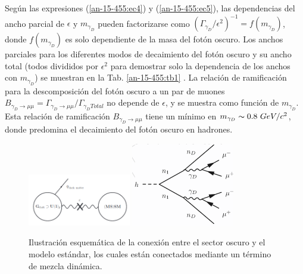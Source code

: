 Según las expresiones (\ref{an-15-455:ec4}) y (\ref{an-15-455:ec5}), las dependencias del ancho parcial de $\epsilon$ y $m_{\gamma_D}$ pueden factorizarse como $ (\Gamma_{\gamma_D}/\epsilon^2)^{-1}= f (m_{\gamma_D})$, donde $f (m_{\gamma_D})$ es solo dependiente de la masa del fotón oscuro. Los anchos parciales para los diferentes modos de decaimiento del fotón oscuro y su ancho total (todos divididos por $\epsilon^2$ para demostrar solo la dependencia de los anchos con $m_{\gamma_D}$) se muestran en la Tab. \ref{an-15-455:tb1} %
. La relación de ramificación para la descomposición del fotón oscuro a un par de muones $B_{\gamma_D\rightarrow \mu\mu} = \Gamma_{\gamma_D\rightarrow \mu\mu} /\Gamma_{\gamma_D Total}$ no depende de $\epsilon$, y se muestra %
como función de $m_{\gamma_D}$. Esta relación de ramificación $B_{\gamma_D\rightarrow\mu\mu}$ tiene un mínimo en $m_{\gamma_D}\thicksim 0.8 ~ GeV/ c^2$, donde predomina el decaimiento del fotón oscuro en hadrones. 

\begin{figure}
    \centering
    \includegraphics[width=0.4\textwidth]{Fisica_de_Particulas/imagenes/sketch_darksector.png}
    \includegraphics[width=0.4\textwidth]{Fisica_de_Particulas/imagenes/darksusy_feynman.png}
    \caption{ Ilustración esquemática de la conexión entre el sector oscuro y el modelo estándar, los cuales están conectados mediante un término de mezcla dinámica.}
    \label{fig:sketch_darksector}
\end{figure}



